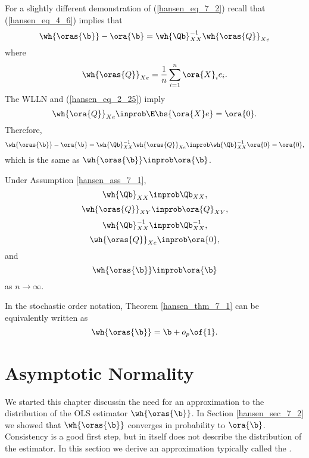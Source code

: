 For a slightly different demonstration of (\ref{hansen_eq_7_2}) recall that (\ref{hansen_eq_4_6}) implies that 
\begin{equation}
    \label{hansen_eq_7_3}
    \wh{\oras{\b}} - \ora{\b} = \wh{\Qb}_{XX}^{-1} \wh{\oras{Q}}_{Xe}
\end{equation}
where 
\begin{equation}
    \notag
    \wh{\oras{Q}}_{Xe} = \frac{1}{n} \sum_{i=1}^{n} \ora{X}_i e_i.
\end{equation}
The WLLN and (\ref{hansen_eq_2_25}) imply 
\begin{equation}
    \notag
    \wh{\ora{Q}}_{Xe} \inprob \E\bs{\ora{X}e} = \ora{0}.
\end{equation}
Therefore, 
\begin{equation}
    \notag
    \wh{\oras{\b}} - \ora{\b} = \wh{\Qb}_{XX}^{-1} \wh{\oras{Q}}_{Xe} \inprob \wh{\Qb}_{XX}^{-1} \ora{0} = \ora{0},
\end{equation}
which is the same as $\wh{\oras{\b}} \inprob \ora{\b}$.

\begin{theorem}
    \label{hansen_thm_7_1}

    Under Assumption \ref{hansen_ass_7_1}, 
    $$\wh{\Qb}_{XX} \inprob \Qb_{XX},$$ 
    $$\wh{\oras{Q}}_{XY} \inprob \ora{Q}_{XY},$$ 
    $$\wh{\Qb}_{XX}^{-1} \inprob \Qb_{XX}^{-1},$$ 
    $$\wh{\oras{Q}}_{Xe} \inprob \ora{0},$$ 
    and 
    $$\wh{\oras{\b}} \inprob \ora{\b}$$ 
    as $n \rightarrow \infty$.
\end{theorem}

In the stochastic order notation, Theorem \ref{hansen_thm_7_1} can be equivalently written as
\begin{equation}
    \label{hansen_eq_7_4}
    \wh{\oras{\b}} = \b + o_p\of{1}.
\end{equation}

\section{Asymptotic Normality} \label{hansen_sec_7_3}

We started this chapter discussin the need for an approximation to the distribution of the OLS estimator $\wh{\oras{\b}}$. In Section \ref{hansen_sec_7_2} we showed that $\wh{\oras{\b}}$ converges in probability to $\ora{\b}$. Consistency is a good first step, but in itself does not describe the distribution of the estimator. In this section we derive an approximation typically called the .

